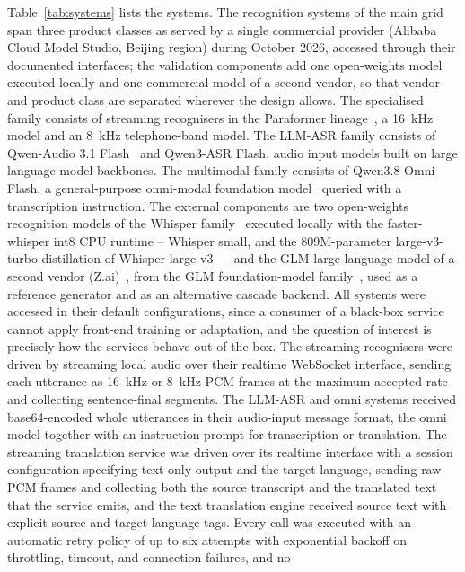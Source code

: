 Table~\ref{tab:systems} lists the systems. The recognition systems of the
main grid span
three product classes as served by a single commercial provider
(Alibaba Cloud Model Studio, Beijing region) during October 2026, accessed
through their documented interfaces; the validation components add one
open-weights model executed locally and one commercial model of a second
vendor, so that vendor and product class are separated wherever the design
allows. The specialised family consists of
streaming recognisers in the Paraformer lineage~\citep{gao2023funasr}, a
16~kHz model and an 8~kHz telephone-band model. The LLM-ASR family consists
of Qwen-Audio 3.1 Flash~\citep{chu2024qwen2audio,qwenaudio31card} and Qwen3-ASR Flash, audio
input models built on large language model backbones. The multimodal family
consists of Qwen3.8-Omni Flash, a general-purpose omni-modal foundation
model~\citep{qwen2.5omni2025,qwenomni38card} queried with a transcription instruction. The
external components are two open-weights recognition models of the Whisper
family~\citep{radford2023robust} executed locally with the faster-whisper
int8 CPU runtime -- Whisper small, and the 809M-parameter large-v3-turbo
distillation of Whisper large-v3~\citep{whisperturbo2024} -- and the GLM
large language model of a second vendor
(Z.ai)~\citep{glm2026api}, from the GLM foundation-model
family~\citep{glm2025tech}, used as a reference generator and as an
alternative cascade backend. All
systems were accessed in their default configurations, since a consumer of a
black-box service cannot apply front-end training or adaptation, and the
question of interest is precisely how the services behave out of the box.
The streaming recognisers were driven by streaming local audio over their
realtime WebSocket interface, sending each utterance as 16~kHz or 8~kHz PCM
frames at the maximum accepted rate and collecting sentence-final segments.
The LLM-ASR and omni systems received base64-encoded whole utterances in
their audio-input message format, the omni model together with an
instruction prompt for transcription or translation. The streaming
translation service was driven over its realtime interface with a session
configuration specifying text-only output and the target language, sending
raw PCM frames and collecting both the source transcript and the translated
text that the service emits, and the text translation engine received
source text with explicit source and target language tags. Every call was
executed with an automatic retry policy of up to six attempts with
exponential backoff on throttling, timeout, and connection failures, and no

